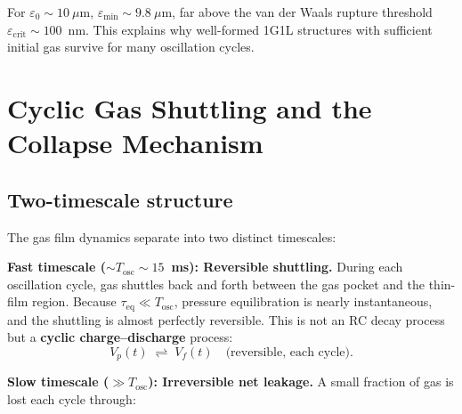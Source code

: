 \documentclass[%
 preprint,
 superscriptaddress,
 amsmath,amssymb,
 aps, prl,
]{revtex4-2}
\begin{document}
For $\varepsilon_0 \sim 10~\mu\text{m}$,
$\varepsilon_{\min} \sim 9.8~\mu\text{m}$, far above the van der Waals
rupture threshold $\varepsilon_{\text{crit}} \sim 100$~nm.
This explains why well-formed 1G1L structures with sufficient initial
gas survive for many oscillation cycles.

\section{Cyclic Gas Shuttling and the Collapse Mechanism}

\subsection{Two-timescale structure}

The gas film dynamics separate into two distinct timescales:

\textbf{Fast timescale ($\sim T_{\text{osc}} \sim 15$~ms): Reversible shuttling.}
During each oscillation cycle, gas shuttles back and forth between the
gas pocket and the thin-film region.  Because $\tau_{\text{eq}} \ll T_{\text{osc}}$,
pressure equilibration is nearly instantaneous, and the shuttling is almost
perfectly reversible.  This is not an RC decay process but a \textbf{cyclic
charge--discharge} process:
\begin{equation}
V_p(t) \;\rightleftharpoons\; V_f(t) \quad\text{(reversible, each cycle)}.
\end{equation}

\textbf{Slow timescale ($\gg T_{\text{osc}}$): Irreversible net leakage.}
A small fraction of gas is lost each cycle through:
\end{document}
